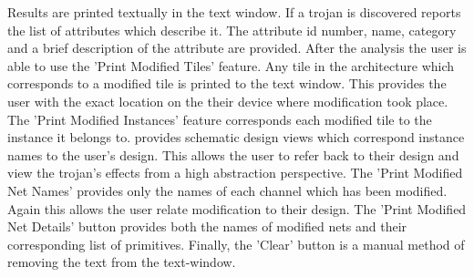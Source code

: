 Results are printed textually in the text window. 
If a trojan is discovered \NameNoPeriod reports the list of attributes which describe it.
The attribute id number, name, category and a brief description of the attribute are provided.
After the analysis the user is able to use the 'Print Modified Tiles' feature.
Any tile in the architecture which corresponds to a modified tile is printed to the text window. 
This provides the user with the exact location on the their device where modification took place.
The 'Print Modified Instances' feature corresponds each modified tile to the instance it belongs to.
\Xilinx provides schematic design views which correspond instance names to the user's design.
This allows the user to refer back to their design and view the trojan's effects from a high abstraction perspective.
The 'Print Modified Net Names' provides only the names of each channel which has been modified. 
Again this allows the user relate modification to their design.
The 'Print Modified Net Details' button provides both the names of modified nets and their corresponding list of primitives.
Finally, the 'Clear' button is a manual method of removing the text from the text-window.
